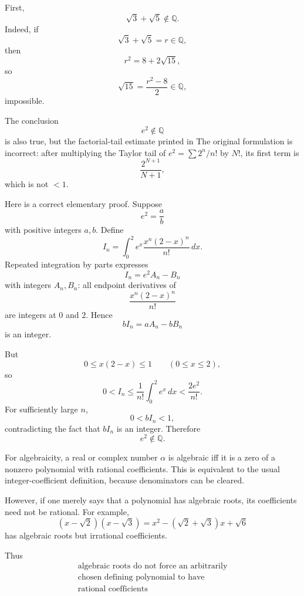 \begin{solution}
First,
\[
\sqrt3+\sqrt5\notin\mathbb Q.
\]
Indeed, if
\[
\sqrt3+\sqrt5=r\in\mathbb Q,
\]
then
\[
r^2=8+2\sqrt{15},
\]
so
\[
\sqrt{15}=\frac{r^2-8}{2}\in\mathbb Q,
\]
impossible.

The conclusion
\[
e^2\notin\mathbb Q
\]
is also true, but the factorial-tail estimate printed in The original formulation is incorrect:
after multiplying the Taylor tail of \(e^2=\sum 2^n/n!\) by \(N!\), its first term is
\[
\frac{2^{N+1}}{N+1},
\]
which is not \(<1\).

Here is a correct elementary proof. Suppose
\[
e^2=\frac ab
\]
with positive integers \(a,b\). Define
\[
I_n
=
\int_0^2
e^x\frac{x^n(2-x)^n}{n!}\,dx.
\]
Repeated integration by parts expresses
\[
I_n=e^2A_n-B_n
\]
with integers \(A_n,B_n\): all endpoint derivatives of
\[
\frac{x^n(2-x)^n}{n!}
\]
are integers at \(0\) and \(2\). Hence
\[
bI_n=aA_n-bB_n
\]
is an integer.

But
\[
0\le x(2-x)\le1
\qquad(0\le x\le2),
\]
so
\[
0<I_n
\le
\frac1{n!}\int_0^2e^x\,dx
<
\frac{2e^2}{n!}.
\]
For sufficiently large \(n\),
\[
0<bI_n<1,
\]
contradicting the fact that \(bI_n\) is an integer. Therefore
\[
\boxed{e^2\notin\mathbb Q.}
\]

For algebraicity, a real or complex number \(\alpha\) is algebraic iff it is a zero of a
nonzero polynomial with rational coefficients. This is equivalent to the usual
integer-coefficient definition, because denominators can be cleared.

However, if one merely says that a polynomial has algebraic roots, its coefficients need not
be rational. For example,
\[
(x-\sqrt2)(x-\sqrt3)
=
x^2-(\sqrt2+\sqrt3)x+\sqrt6
\]
has algebraic roots but irrational coefficients.

Thus
\[
\boxed{\begin{gathered}
\text{algebraic roots do not force an arbitrarily}
\\
\text{chosen defining polynomial to have}
\\
\text{rational coefficients}
\end{gathered}}
\]
\end{solution}


